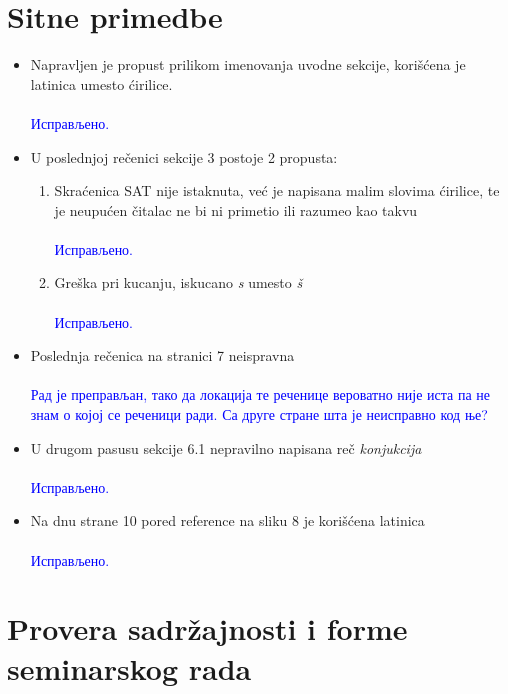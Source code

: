 \documentclass[a4paper]{report}
\newcommand{\odgovor}[1]{\textcolor{blue}{#1}}
\newcommand{\say}[1]{\textit{#1}}
\begin{document}
\section{Sitne primedbe}
\begin{itemize}
 \item Napravljen je propust prilikom imenovanja uvodne sekcije, korišćena je latinica umesto ćirilice.
     \\\\
    \odgovor{Исправљено.} 
	\\
 \item U poslednjoj rečenici sekcije 3 postoje 2 propusta:
 	\begin{enumerate}
 		\item Skraćenica SAT nije istaknuta, već je napisana malim slovima ćirilice, te je neupućen čitalac ne bi ni primetio ili razumeo kao takvu
     \\\\
    \odgovor{Исправљено.} 
	\\
 		\item Greška pri kucanju, iskucano \say{s} umesto \say{š}
     \\\\
    \odgovor{Исправљено.} 
	\\
 	\end{enumerate}
 \item Poslednja rečenica na stranici 7 neispravna
 \\\\
    \odgovor{Рад је преправљан, тако да локација те реченице вероватно није иста па не знам о којој се реченици ради. Са друге стране шта је неисправно код ње?} 
	\\
 \item U drugom pasusu sekcije 6.1 nepravilno napisana reč \say{konjukcija}
    \\\\
    \odgovor{Исправљено.} 
	\\
 \item Na dnu strane 10 pored reference na sliku 8 je korišćena latinica
      \\\\
    \odgovor{Исправљено.} 
	\\
\end{itemize}

\section{Provera sadržajnosti i forme seminarskog rada}
\end{document}
